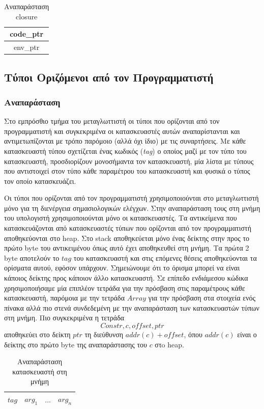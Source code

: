 \documentclass[12pt]{article}
\begin{document}
\begin{table}[htbp]
\centering
    \begin{tabular}{|c|}
    \hline
    code\_ptr \\ \hline
    env\_ptr  \\ \hline
    \end{tabular}
    \caption{Αναπαράσταση closure}
\end{table}


\subsection{Τύποι Οριζόμενοι από τον Προγραμματιστή}
\subsubsection{Αναπαράσταση}
Στο εμπρόσθιο τμήμα του μεταγλωττιστή οι τύποι που ορίζονται από τον προγραμματιστή και συγκεκριμένα οι κατασκευαστές αυτών αναπαρίστανται και αντιμετωπίζονται με τρόπο παρόμοιο (αλλά όχι ίδιο) με τις συναρτήσεις. Με κάθε κατασκευαστή τύπου  σχετίζεται ένας κωδικός (\textit{tag}) ο οποίος μαζί με τον τύπο του κατασκευαστή, προσδιορίζουν μονοσήμαντα τον κατασκευαστή, μία λίστα με τύπους που αντιστοιχεί στον τύπο κάθε παραμέτρου του κατασκευαστή και φυσικά ο τύπος τον οποίο κατασκευάζει. 

Οι τύποι που ορίζονται από τον προγραμματιστή χρησιμοποιούνται στο μεταγλωττιστή μόνο για τη διενέργεια σημασιολογικών ελέγχων. Στην αναπαράσταση τους στη μνήμη του υπολογιστή χρησιμοποιούνται μόνο οι κατασκευαστές.
Τα αντικείμενα που κατασκευάζονται από κατασκευαστές τύπων που ορίζονται από τον προγραμματιστή αποθηκεύονται στο heap. Στο stack αποθηκεύεται μόνο ένας δείκτης στην προς το πρώτο byte του αντικειμένου όπως αυτό έχει αποθηκευθεί στη μνήμη.  Τα πρώτα 2 byte αποτελούν το $tag$ του κατασκευαστή και στις επόμενες θέσεις αποθηκεύονται τα ορίσματα αυτού, εφόσον υπάρχουν. Σημειώνουμε ότι το όρισμα μπορεί να είναι κάποιος δείκτης προς κάποιον άλλο κατασκευαστή.
Σε επίπεδο ενδιάμεσου κώδικα χρησιμοποιήσαμε μία επιπλέον τετράδα για την πρόσβαση στις παραμέτρους κάθε κατασκευαστή, παρόμοια με την τετράδα $Array$ για την πρόσβαση στα στοιχεία ενός πίνακα αλλά πιο στενά συνδεδεμένη με την αναπαράσταση των κατασκευαστών τύπων στη μνήμη. Πιο συγκεκριμένα η τετράδα
$$ Constr, c, offset, ptr$$
αποθηκεύει στο δείκτη $ptr$ τη διεύθυνση $addr(c)+offset$, όπου $addr(c)$ είναι ο δείκτης στο πρώτο byte της αναπαράστασης του $c$ στo heap.

\begin{table}[htbp]
\centering
    \begin{tabular}{|l|c|l|l|}
    \hline
    $tag$ & $arg_1$ & $\ldots$ & $arg_n$ \\ \hline
    \end{tabular}
    \caption{Αναπαράσταση κατασκευαστή στη μνήμη}
\end{table}
\end{document}
